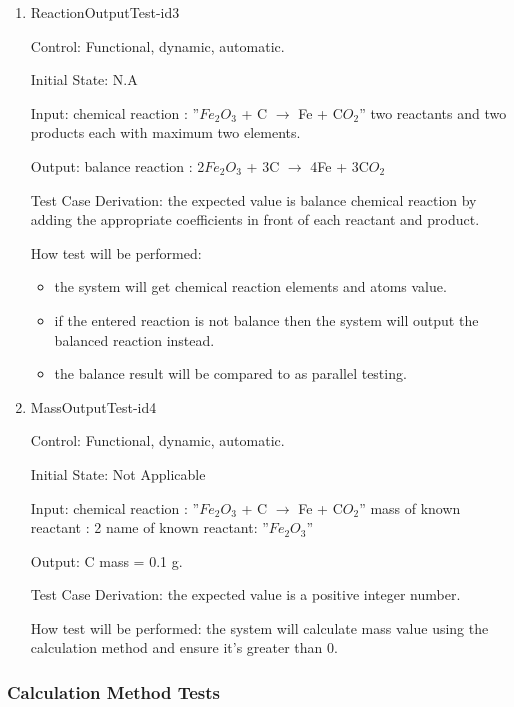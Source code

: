 \documentclass[12pt, titlepage]{article}
\begin{document}
\begin{enumerate}

\item{ReactionOutputTest-id3\\}

Control: Functional, dynamic, automatic.
					
Initial State: N.A
					
Input: 
chemical reaction : ”$Fe_2$$O_3$ + C $\rightarrow$ Fe + C$O_2$”
two reactants and two products each with maximum two elements.
	
Output: balance reaction : 2$Fe_2$$O_3$ + 3C $\rightarrow$ 4Fe + 3C$O_2$

Test Case Derivation: the expected value is balance chemical reaction by adding the appropriate coefficients in front of each reactant and product.

How test will be performed: 
\begin{itemize}
\item the system will get chemical reaction elements and atoms value. 
\item if the entered reaction is not balance then the system will output the balanced reaction instead. 
\item the balance result will be compared to \cite{OnlineBalancer} as parallel testing.
\end{itemize}


\item{MassOutputTest-id4\\}

Control: Functional, dynamic, automatic.
					
Initial State: Not Applicable
					
Input:
\newline
chemical reaction : ”$Fe_2$$O_3$ + C $\rightarrow$ Fe + C$O_2$”
\newline
mass of known reactant : 2
\newline
name of known reactant: ”$Fe_2$$O_3$”
				
Output: C mass = 0.1 g. 

Test Case Derivation: the expected value is a positive integer number. 
					
How test will be performed: 
the system will calculate mass value using the calculation method and ensure it's greater than 0.
 


\end{enumerate}	

\subsubsection{Calculation Method Tests}
\end{document}

